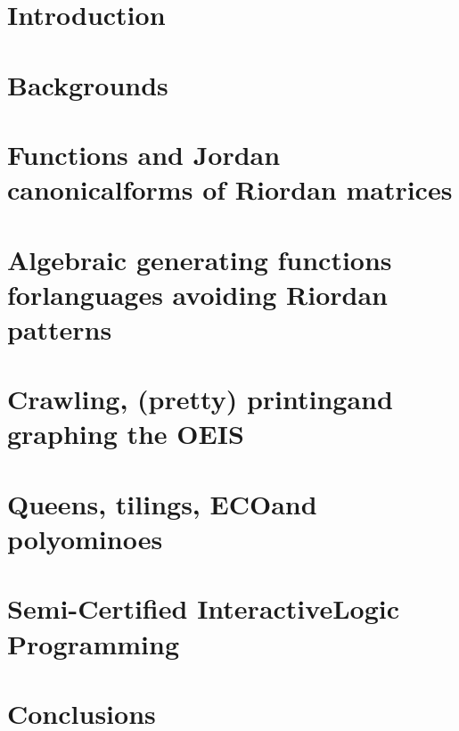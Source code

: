 \documentclass[a4paper,10pt]{tufte-book}
\begin{document}
\cleardoublepage

\chapter*{Introduction}


\cleardoublepage

\chapter{Backgrounds}
\label{ch:backgrounds}



\chapter{Functions and Jordan canonical\newline forms of Riordan matrices}
\label{ch:Riordan-matrices-function}



\chapter{Algebraic generating functions for\newline languages avoiding Riordan patterns}
\label{ch:algebraic-gfs-languages-avoiding-Riordan-patterns}



\chapter{Crawling, (pretty) printing\newline and graphing the OEIS}
\label{ch:OEIS:tools}



\chapter{Queens, tilings, ECO\newline and polyominoes}
\label{ch:queens-tilings-polyominoes}



\chapter{Semi-Certified Interactive\newline Logic Programming}
\label{ch:scilp}



\chapter*{Conclusions}




\end{document}
